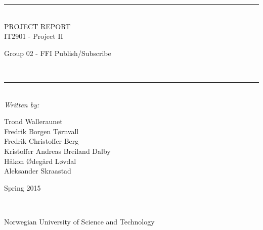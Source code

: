 \thispagestyle{empty}
\begin{center}
\noindent\rule{\textwidth}{0.5pt}
\\[1pc]
\Huge{PROJECT REPORT}
\\[1pc]
\large{IT2901 - Project II}
\\[1pc]
\begin{small}
\begin{bf}Group 02 - FFI Publish/Subscribe\end{bf}
\end{small}
\\[1pc]
\noindent\rule{\textwidth}{0.5pt}
\\[5pc]
\textit{Written by:}
\\[1pc]
\begin{small}
Trond Walleraunet\\Fredrik Borgen Tørnvall\\Fredrik Christoffer Berg\\Kristoffer Andreas Breiland Dalby\\Håkon Ødegård Løvdal\\Aleksander Skraastad \\[7pc]
\end{small}
\begin{bf}
Spring 2015
\end{bf}
\\[8pc]

\noindent{}

\begin{small}Norwegian University of Science and Technology\end{small}

\end{center}

\pagebreak